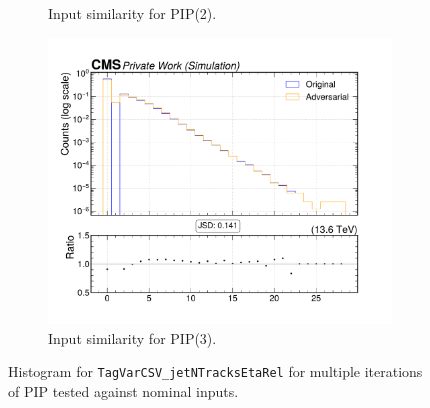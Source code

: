 \begin{figure}[htbp]
\begin{subfigure}[t]{0.32\textwidth}
    \caption{Input similarity for PIP(2).}
  \end{subfigure}\hfill
  \begin{subfigure}[t]{0.32\textwidth}
    \includegraphics[width=\linewidth]{media/output/features/compare/intprob_3/cmp_global_features_TagVarCSV_jetNTracksEtaRel.pdf}
    \caption{Input similarity for PIP(3).}
  \end{subfigure}

  \caption{Histogram for \texttt{TagVarCSV\_jetNTracksEtaRel} for multiple iterations of PIP tested against nominal inputs.}
  \label{fig:intprob_input_TagVarCSV_jetNTracksEtaRel}
\end{figure}
